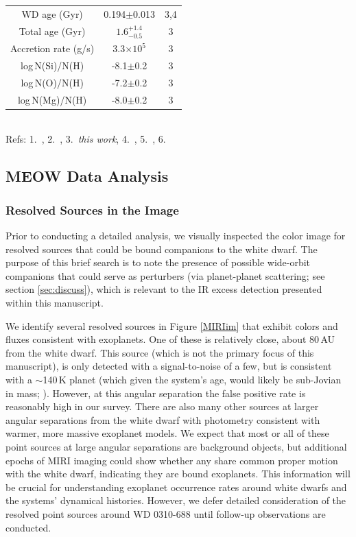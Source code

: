 \documentclass[twocolumn]{aastex631}
\begin{document}
\begin{table}[h]
\begin{tabular}{c|c|c}
WD age (Gyr) & 0.194$\pm$0.013 & 3,4\\
Total age (Gyr) & $1.6_{-0.5}^{+1.4}$ &3\\ 
Accretion rate (g/s) & 3.3$\times10^5$ & 3\\
log\,N(Si)/N(H) & -8.1$\pm$0.2 &3\\
log\,N(O)/N(H) & -7.2$\pm$0.2&3\\
log\,N(Mg)/N(H) & -8.0$\pm$0.2&3
\end{tabular}
\\
\vspace{1mm}
{\footnotesize Refs: 1.~\citealt{2020yCat.1350....0G}, 2.~\citealt{2020A&A...638A.131N}, 3.~{\it this work}, 4.~\citealt{2021MNRAS.508.3877G}, 5.~\citealt{2010MNRAS.403.1949K}, 6.~\citealt{2003yCat.2246....0C}}
\vspace{1mm}
\end{table}



\subsection{MEOW Data Analysis}
{

\subsubsection{Resolved Sources in the Image}
}

{Prior to conducting a detailed analysis, we visually inspected the color image for resolved sources that could be bound companions to the white dwarf. The purpose of this brief search is to note the presence of possible wide-orbit companions that could serve as perturbers (via planet-planet scattering; see section \ref{sec:discuss}), which is relevant to the IR excess detection presented within this manuscript.}

We identify several resolved sources in Figure \ref{MIRIim} that exhibit colors and fluxes consistent with exoplanets. One of these is relatively close, about 80\,AU from the white dwarf. This source (which is  not the primary focus of this manuscript), is only detected with a signal-to-noise of a few, but is consistent with a $\sim$140\,K planet (which given the system's age, would likely be sub-Jovian in mass; \citealt{2019A&A...623A..85L}). However, at this angular separation the false positive rate is reasonably high in our survey. There are also many other sources at larger angular separations from the white dwarf with photometry consistent with warmer, more massive exoplanet models. We expect that most or all of these point sources {at large angular separations} are background objects, but additional epochs of MIRI imaging could show whether any share common proper motion with the white dwarf, indicating they are bound exoplanets. This information will be crucial for understanding exoplanet occurrence rates around white dwarfs and the systems' dynamical histories. However, we defer detailed consideration of the resolved point sources around WD 0310-688 until follow-up observations are conducted. 
\end{document}
